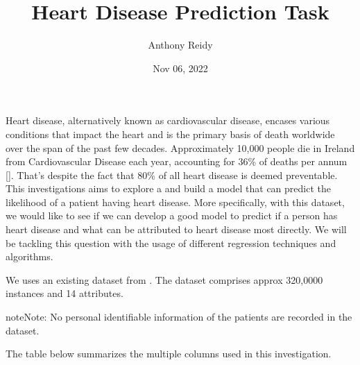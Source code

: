 \documentclass[letterpaper,10pt,english]{jupyterBook}
\title{Heart Disease Prediction Task}
\date{Nov 06, 2022}
\author{Anthony Reidy}
\begin{document}
\pagestyle{empty}
\sphinxmaketitle
\pagestyle{plain}
\sphinxtableofcontents
\pagestyle{normal}
\label{\detokenize{Introduction::doc}}


\sphinxAtStartPar
Heart disease, alternatively known as cardiovascular disease, encases various conditions that impact the heart and is the primary basis of death worldwide over the span of the past few decades. Approximately 10,000 people die in Ireland from Cardiovascular Disease each year, accounting for 36\% of deaths per annum {[}{]}. That’s despite the fact that 80\% of all heart disease is deemed preventable. This investigations aims to explore a  and build a model that can predict the likelihood of a patient having heart disease. More specifically, with this dataset, we would like to see if we can develop a good model to predict if a person has heart disease and what  can be attributed to heart disease most directly. We will be tackling this question with the usage of different regression techniques and algorithms.

\begin{DUlineblock}{0em}
\item[] 
\end{DUlineblock}

\sphinxAtStartPar
We uses an existing dataset from . The dataset comprises approx 320,0000 instances and 14 attributes.

\begin{sphinxadmonition}{note}{Note:}
\sphinxAtStartPar
No personal identifiable information of the patients are recorded in the dataset.
\end{sphinxadmonition}

\sphinxAtStartPar
The table below summarizes the multiple columns used in this investigation.
\end{document}
